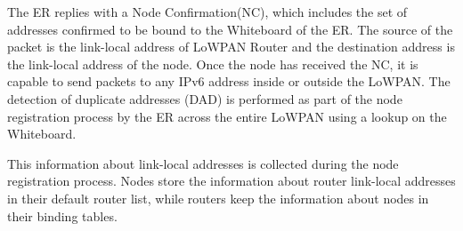 The ER replies with a Node Confirmation(NC), which includes the set of addresses confirmed to be bound to the Whiteboard of the ER.  The
source of the packet is the link-local address of LoWPAN Router and the destination address is the link-local address of the node. Once the node has received the NC, it is capable to send packets to any IPv6 address inside or outside the LoWPAN. The detection of duplicate addresses (DAD) is performed as part of the node registration process by the ER across the entire LoWPAN using a lookup on the Whiteboard. 

This information about link-local addresses is collected during the node registration process. Nodes store the information about router link-local addresses in their default router list, while routers keep the information about nodes in their binding tables. 

